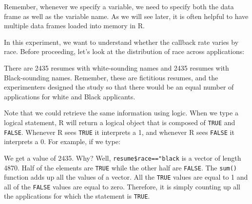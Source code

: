 \documentclass[
]{book}
\newenvironment{Shaded}{\begin{snugshade}}{\end{snugshade}}
\newcommand{\DecValTok}[1]{\textcolor[rgb]{0.00,0.00,0.81}{#1}}
\newcommand{\FloatTok}[1]{\textcolor[rgb]{0.00,0.00,0.81}{#1}}
\newcommand{\FunctionTok}[1]{\textcolor[rgb]{0.13,0.29,0.53}{\textbf{#1}}}
\newcommand{\NormalTok}[1]{#1}
\newcommand{\SpecialCharTok}[1]{\textcolor[rgb]{0.81,0.36,0.00}{\textbf{#1}}}
\newcommand{\StringTok}[1]{\textcolor[rgb]{0.31,0.60,0.02}{#1}}
\begin{document}
\begin{Shaded}
\end{Shaded}

Remember, whenever we specify a variable, we need to specify both the data frame as well as the variable name. As we will see later, it is often helpful to have multiple data frames loaded into memory in R.

In this experiment, we want to understand whether the callback rate varies by race. Before proceeding, let's look at the distribution of race across applications:

\begin{Shaded}
\end{Shaded}

There are 2435 resumes with white-sounding names and 2435 resumes with Black-sounding names. Remember, these are fictitious resumes, and the experimenters designed the study so that there would be an equal number of applications for white and Black applicants.

Note that we could retrieve the same information using logic. When we type a logical statement, R will return a logical object that is composed of \texttt{TRUE} and \texttt{FALSE}. Whenever R sees \texttt{TRUE} it interprets a 1, and whenever R sees \texttt{FALSE} it interprets a 0. For example, if we type:

\begin{Shaded}
\end{Shaded}

We get a value of 2435. Why? Well, \texttt{resume\$race=="black} is a vector of length 4870. Half of the elements are \texttt{TRUE} while the other half are \texttt{FALSE}. The \texttt{sum()} function adds up all the values of a vector. All the \texttt{TRUE} values are equal to 1 and all of the \texttt{FALSE} values are equal to zero. Therefore, it is simply counting up all the applications for which the statement is \texttt{TRUE}.
\end{document}
